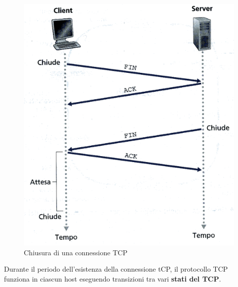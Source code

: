 \documentclass[11pt,a4paper]{article}
\begin{document}
\begin{figure}
	\includegraphics[scale=0.6]{img/036.png}
	\caption{Chiusura di una connessione TCP}
\end{figure}
Durante il periodo dell'esistenza della connessione tCP, il protocollo TCP funziona in ciascun host eseguendo transizioni tra vari \textbf{stati del TCP}. 
\end{document}
